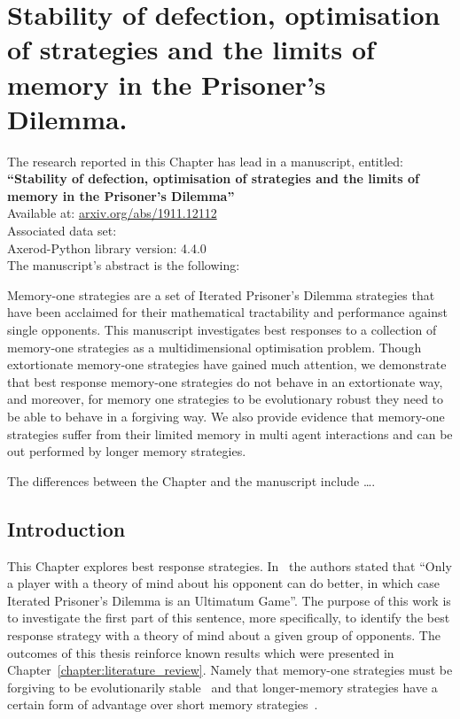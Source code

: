 
\chapter{Stability of defection, optimisation of strategies and the limits of
       memory in the Prisoner's Dilemma.}\label{chapter:memory_one}

\begin{center}
    The research reported in this Chapter has lead in a manuscript, entitled: \\
    \textbf{``Stability of defection, optimisation of strategies and the limits of memory in the Prisoner's Dilemma''} \\
    Available at: \url{arxiv.org/abs/1911.12112} \\
    Associated data set: \cite{glynatsi2019} \\
    Axerod-Python library version: 4.4.0 \\ \vspace{.5cm}
    The manuscript's abstract is the following:
\end{center}

Memory-one strategies are a set of Iterated Prisoner's Dilemma strategies that
have been acclaimed for their mathematical tractability and performance against
single opponents. This manuscript investigates best responses to a collection of
memory-one strategies as a multidimensional optimisation problem. Though
extortionate memory-one strategies have gained much attention, we demonstrate
that best response memory-one strategies do not behave in an extortionate way,
and moreover, for memory one strategies to be evolutionary robust they need to
be able to behave in a forgiving way. We also provide evidence that memory-one
strategies suffer from their limited memory in multi agent interactions and can
be out performed by longer memory strategies.

The differences between the Chapter and the manuscript include \dots.

\newpage

\section{Introduction}\label{section:mem_one_introduction}

This Chapter explores best response strategies. In~\cite{Press2012} the authors
stated that ``Only a player with a theory of mind about his opponent can do
better, in which case Iterated Prisoner's Dilemma is an Ultimatum Game''. The
purpose of this work is to investigate the first part of this sentence, more
specifically, to identify the best response strategy with a theory of mind about
a given group of opponents. The outcomes of this thesis reinforce known results
which were presented in Chapter~\ref{chapter:literature_review}. Namely that
memory-one strategies must be forgiving to be evolutionarily
stable~\cite{Stewart2013, Stewart2016} and that longer-memory strategies have a
certain form of advantage over short memory strategies~\cite{Hilbe2017,
Pan2015}.

